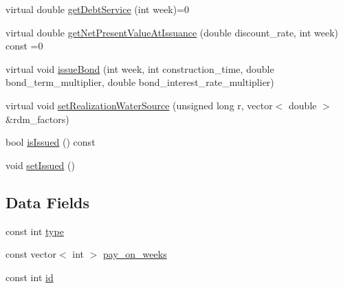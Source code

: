 \begin{DoxyCompactItemize}
virtual double \mbox{\hyperlink{classBond_a98d8ecaf4b36319674ebd220598996bc_a98d8ecaf4b36319674ebd220598996bc}{get\+Debt\+Service}} (int week)=0
\item 
virtual double \mbox{\hyperlink{classBond_a5997278813deb16aa5d01bbca8ecc7b2_a5997278813deb16aa5d01bbca8ecc7b2}{get\+Net\+Present\+Value\+At\+Issuance}} (double discount\+\_\+rate, int week) const =0
\item 
virtual void \mbox{\hyperlink{classBond_a377db8c18b83c4666e46686bc26adef1_a377db8c18b83c4666e46686bc26adef1}{issue\+Bond}} (int week, int construction\+\_\+time, double bond\+\_\+term\+\_\+multiplier, double bond\+\_\+interest\+\_\+rate\+\_\+multiplier)
\item 
virtual void \mbox{\hyperlink{classBond_a19fd997eed14b4cb4151063c24a13cdd_a19fd997eed14b4cb4151063c24a13cdd}{set\+Realization\+Water\+Source}} (unsigned long r, vector$<$ double $>$ \&rdm\+\_\+factors)
\item 
bool \mbox{\hyperlink{classBond_a6342f3dd3295771b71ac1fcc3b666a42_a6342f3dd3295771b71ac1fcc3b666a42}{is\+Issued}} () const
\item 
void \mbox{\hyperlink{classBond_a573de514b0044cec6a76bb63b098b40a_a573de514b0044cec6a76bb63b098b40a}{set\+Issued}} ()
\end{DoxyCompactItemize}
\subsection*{Data Fields}
\begin{DoxyCompactItemize}
\item 
const int \mbox{\hyperlink{classBond_a48da24878beedd71cbaa990cea860667_a48da24878beedd71cbaa990cea860667}{type}}
\item 
const vector$<$ int $>$ \mbox{\hyperlink{classBond_ae8dd46fcbf95c993460ffe4ea1f52739_ae8dd46fcbf95c993460ffe4ea1f52739}{pay\+\_\+on\+\_\+weeks}}
\item 
const int \mbox{\hyperlink{classBond_a7f75bcafbc16676ad6dbafbf40afae4a_a7f75bcafbc16676ad6dbafbf40afae4a}{id}}
\end{DoxyCompactItemize}
